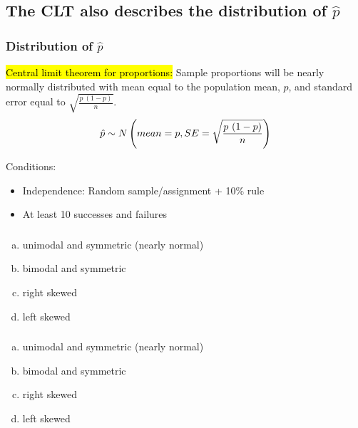 \documentclass[11pt,containsverbatim,handout,xcolor=xelatex,dvipsnames,table]{beamer}
\newcommand{\solnMult}[1]{#1}
\begin{document}

\subsection{The CLT also describes the distribution of $\hat{p}$}
\label{mi2}


\begin{frame}
\frametitle{Distribution of $\hat{p}$}

\hl{Central limit theorem for proportions:} Sample proportions will be nearly normally distributed with mean equal to the population mean, $p$, and standard error equal to $\sqrt{\frac{p~(1-p)}{n}}$.
\[ \hat{p} \sim N \left(  mean = p, SE = \sqrt{\frac{p~(1-p)}{n}}  \right) \]

Conditions:
\begin{itemize}
\item Independence: Random sample/assignment + 10\% rule
\item At least 10 successes and failures
\end{itemize}

\end{frame}


\begin{frame}
\frametitle{}


\begin{enumerate}[(a)]
\item unimodal and symmetric (nearly normal)
\item bimodal and symmetric
\item right skewed
\item \solnMult{left skewed}
\end{enumerate}

\end{frame}


\begin{frame}
\frametitle{}


\begin{enumerate}[(a)]
\item unimodal and symmetric (nearly normal)
\item bimodal and symmetric
\item \solnMult{right skewed}
\item left skewed
\end{enumerate}

\end{frame}
\end{document}
